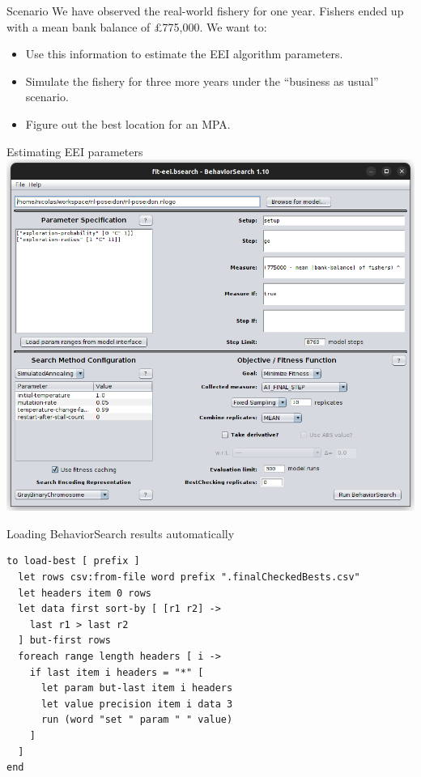 \documentclass[table, 14pt, aspectratio=169]{beamer}
\begin{document}
\begin{frame}{Scenario}
  \vfill
  We have observed the real-world fishery for one year.
  \vfill
  Fishers ended up with a mean bank balance of £775,000.
  \vfill
  We want to:
  \vfill
  \begin{itemize}
    \item Use this information to estimate the EEI algorithm parameters.
    \vfill
    \item Simulate the fishery for three more years under the ``business as usual'' scenario.
    \vfill
    \item Figure out the best location for an MPA.
  \end{itemize}
  \vfill
\end{frame}

\begin{frame}{Estimating EEI parameters}
  \centering
  \includegraphics[height=0.8\textheight]{images/bsearch_fit_eei.png}
\end{frame}

\begin{frame}[fragile=singleslide]{Loading BehaviorSearch results automatically}
  \begin{adjustbox}{max height=0.8\textheight, max width = \linewidth}
    \begin{verbatim}  
to load-best [ prefix ]
  let rows csv:from-file word prefix ".finalCheckedBests.csv"
  let headers item 0 rows
  let data first sort-by [ [r1 r2] -> 
    last r1 > last r2 
  ] but-first rows
  foreach range length headers [ i ->
    if last item i headers = "*" [
      let param but-last item i headers
      let value precision item i data 3
      run (word "set " param " " value)
    ]
  ]
end
    \end{verbatim}
  \end{adjustbox}
\end{frame}
\end{document}
